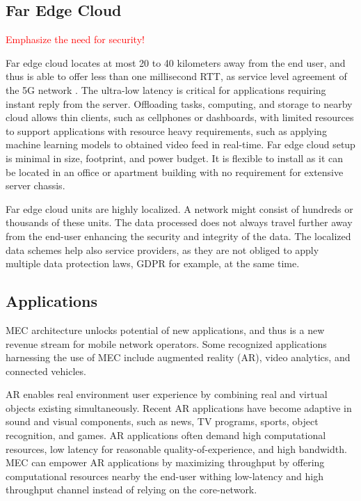 \subsection{Far Edge Cloud}

\textcolor{red}{Emphasize the need for security!}

Far edge cloud locates at most 20 to 40 kilometers away from the end user, and thus is able to offer less than one millisecond RTT, as service level agreement of the 5G network \cite{?}. The ultra-low latency is critical for applications requiring instant reply from the server. Offloading tasks, computing, and storage to nearby cloud allows thin clients, such as cellphones or dashboards, with limited resources to support applications with resource heavy requirements, such as applying machine learning models to obtained video feed in real-time. Far edge cloud setup is minimal in size, footprint, and power budget. It is flexible to install as it can be located in an office or apartment building with no requirement for extensive server chassis. \cite{AirFrameOpenEdgeServer}

Far edge cloud units are highly localized. A network might consist of hundreds or thousands of these units. The data processed does not always travel further away from the end-user enhancing the security and integrity of the data. The localized data schemes help also service providers, as they are not obliged to apply multiple data protection laws, GDPR for example, at the same time. 

\subsection{Applications}

MEC architecture unlocks potential of new applications, and thus is a new revenue stream for mobile network operators. Some recognized applications harnessing the use of MEC include augmented reality (AR), video analytics, and connected vehicles.

AR enables real environment user experience by combining real and virtual objects existing simultaneously. Recent AR applications have become adaptive in sound and visual components, such as news, TV programs, sports, object recognition, and games. AR applications often demand high computational resources, low latency for reasonable quality-of-experience, and high bandwidth. MEC can empower AR applications by maximizing throughput by offering computational resources nearby the end-user withing low-latency and high throughput channel instead of relying on the core-network. \cite{Abbas2018}

